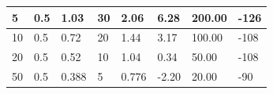 \documentclass[dvipdfmx,titlepage,a4j]{jsarticle}  %
\begin{document}
\begin{table}[H]
\begin{tabular}{ll|ll|llll}
  \multicolumn{1}{l|}{5}             & 0.5         & \multicolumn{1}{l|}{1.03}        & 30              & \multicolumn{1}{l|}{2.06}    & \multicolumn{1}{l|}{6.28}            & \multicolumn{1}{l|}{200.00}          & -126                                \\ \hline
  \multicolumn{1}{|l|}{10}           & 0.5         & \multicolumn{1}{l|}{0.72}        & 20              & \multicolumn{1}{l|}{1.44}    & \multicolumn{1}{l|}{3.17}            & \multicolumn{1}{l|}{100.00}          & \multicolumn{1}{l|}{-108}           \\ \hline
  \multicolumn{1}{|l|}{20}           & 0.5         & \multicolumn{1}{l|}{0.52}        & 10              & \multicolumn{1}{l|}{1.04}    & \multicolumn{1}{l|}{0.34}            & \multicolumn{1}{l|}{50.00}           & \multicolumn{1}{l|}{-108}           \\ \hline
  \multicolumn{1}{|l|}{50}           & 0.5         & \multicolumn{1}{l|}{0.388}       & 5               & \multicolumn{1}{l|}{0.776}   & \multicolumn{1}{l|}{-2.20}           & \multicolumn{1}{l|}{20.00}           & \multicolumn{1}{l|}{-90}            \\ \hline
  \end{tabular}
\end{table}
\end{document}
